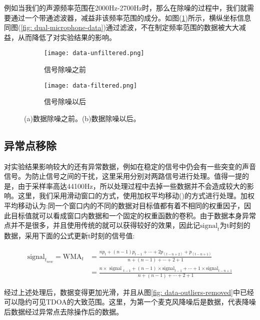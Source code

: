 \documentclass[winfonts]{njuthesis}
\begin{document}
			例如当我们的声源频率范围在2000Hz-2700Hz时，那么在除噪的过程中，我们就需要通过一个带通滤波器，减益非该频率范围的成分。如图(\ref{fig: filter-data})所示，横纵坐标信息同图(\ref{fig: dual-microphone-data})通过滤波，不在制定频率范围的数据被大大减益，从而降低了对实验结果的影响。
			
			\begin{figure}[ht!]
				\centering
				\begin{subfigure}{.45\textwidth}
					\centering
					\texttt{[image: data-unfiltered.png]}
					\caption{信号除噪之前}
				\end{subfigure}
				\begin{subfigure}{.45\textwidth}
					\centering
					\texttt{[image: data-filtered.png]}
					\caption{信号除噪以后}
				\end{subfigure}
				\caption{(a)数据除噪之前。(b)数据除噪以后。}
				\label{fig: filter-data}
			\end{figure}
					
		\subsection{异常点移除}
		
			对实验结果影响较大的还有异常数据，例如在稳定的信号中仍会有一些突变的声音信号。为防止信号之间的干扰，这里采用分别对两路信号进行处理。值得一提的是，由于采样率高达44100Hz，所以处理过程中去掉一些数据并不会造成较大的影响。这里，我们采用滑动窗口的方式，使用加权平均移动(\cite{Moving_average})的方式进行处理。加权平均移动认为:同一个窗口内的不同的数据对目标值都有着不相同的权重因子，因此目标值就可以看成窗口内数据和一个固定的权重函数的卷积。由于数据本身异常点并不是很多，并且使用传统的就可以获得较好的效果，因此记$\text{signal}_t$为t时刻的数据，采用下面的公式更新t时刻的信号值:
			
			\begin{equation}
			\begin{aligned}
				\text{signal}_{t_{new}} = \text{WMA}_{t}&=\frac{n p_{t}+(n-1) p_{t-1}+\cdots+2 p_{(t-n+2)}+p_{(t-n+1)}}{n+(n-1)+\cdots+2+1}\\
											  &=\frac{n \times \text { signal }_{t-1}+(n-1) \times \text {signal}_{t-1}+\cdots+1 \times \text {signal}_{t-n+1}}{n+(n-1)+\cdots+2+1}								 
			\end{aligned}
			\end{equation}
			
			经过上述处理后，数据变得更加光滑，并且从图\ref{fig: data-outliers-removed}中已经可以隐约可见TDOA的大致范围。这里，为第一个麦克风降噪后是数据，代表降噪后数据经过异常点去除操作后的数据。
			
\end{document}
